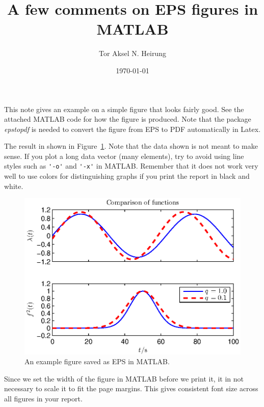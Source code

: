 \documentclass[USenglish, a4paper]{article}
\author{Tor Aksel N. Heirung}
\title{A few comments on EPS figures in MATLAB}
\date{\today}
\begin{document}
\maketitle
\thispagestyle{empty}

This note gives an example on a simple figure that looks fairly good. See the attached MATLAB code for how the figure is produced. Note that the package \emph{epstopdf} is needed to convert the figure from EPS to PDF automatically in Latex.

The result in shown in Figure~\ref{fig:testfig}. Note that the data shown is not meant to make sense. If you plot a long data vector (many elements), try to avoid using line styles such as \verb|'-o'| and \verb|'-x'| in MATLAB. Remember that it does not work very well to use colors for distinguishing graphs if you print the report in black and white.

\begin{figure}[htb]
	\centering
		\includegraphics{testfig.eps}
	\caption{An example figure saved as EPS in MATLAB.}
	\label{fig:testfig}
\end{figure}

Since we set the width of the figure in MATLAB before we print it, it in not necessary to scale it to fit the page margins. This gives consistent font size across all figures in your report.
\end{document}
